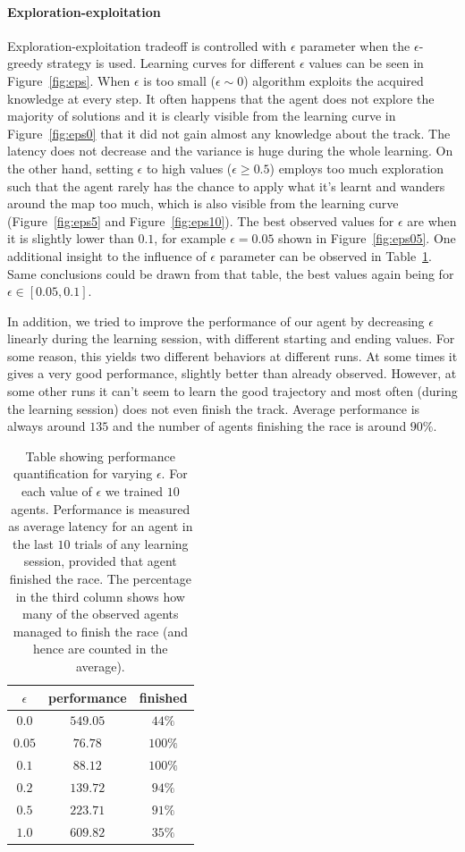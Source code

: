 \paragraph{Exploration-exploitation}
Exploration-exploitation tradeoff is controlled with $\epsilon$ parameter when
the $\epsilon$-greedy strategy is used. Learning curves for different $\epsilon$
values can be seen in Figure~\ref{fig:eps}. When $\epsilon$ is too small
($\epsilon \sim 0$) algorithm exploits the acquired knowledge at every step. It
often happens that the agent does not explore the majority of solutions and it
is clearly visible from the learning curve in Figure~\ref{fig:eps0} that it did
not gain almost any knowledge about the track. The latency does not decrease and
the variance is huge during the whole learning. On the other hand, setting
$\epsilon$ to high values ($\epsilon \ge 0.5$) employs too much exploration such
that the agent rarely has the chance to apply what it's learnt and wanders
around the map too much, which is also visible from the learning curve
(Figure~\ref{fig:eps5} and Figure~\ref{fig:eps10}). The best observed values for
$\epsilon$ are when it is slightly lower than $0.1$, for example $\epsilon =
0.05$ shown in Figure~\ref{fig:eps05}.  One additional insight to the influence
of $\epsilon$ parameter can be observed in Table~\ref{tab:perf}. Same
conclusions could be drawn from that table, the best values again being for
$\epsilon \in [0.05, 0.1]$.

In addition, we tried to improve the performance of our agent by decreasing
$\epsilon$ linearly during the learning session, with different starting and
ending values. For some reason, this yields two different behaviors at different
runs. At some times it gives a very good performance, slightly better than
already observed. However, at some other runs it can't seem to learn the good
trajectory and most often (during the learning session) does not even finish the
track. Average performance is always around $135$ and the number of agents
finishing the race is around $90\%$.

\begin{table}[h!]
\centering
\begin{tabular}{|c|c|c|}
\hline
$\epsilon$ & performance & finished \\
\hline
$0.0$ & $549.05$ & $44\%$\\
\hline
$0.05$ & $76.78$ & $100\%$ \\
\hline
$0.1$ & $88.12$ & $100\%$ \\
\hline
$0.2$ & $139.72$ & $94\%$ \\
\hline
$0.5$ & $223.71$ & $91\%$ \\
\hline
$1.0$ & $609.82$ & $35\%$ \\
\hline
\end{tabular}
\caption{\label{tab:perf}Table showing performance quantification for varying
$\epsilon$. For each value of $\epsilon$ we trained $10$ agents. Performance is
measured as average latency for an agent in the last $10$ trials of any learning
session, provided that agent finished the race. The percentage in the third
column shows how many of the observed agents managed to finish the race (and
hence are counted in the average).}
\end{table}

